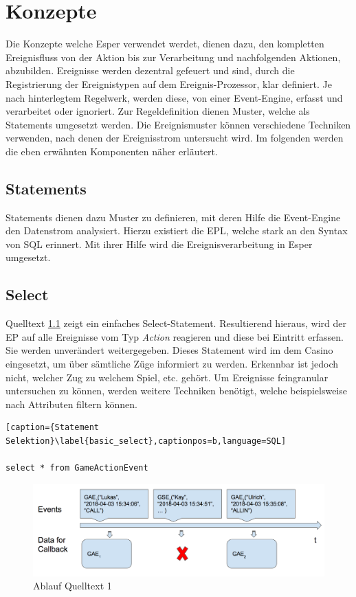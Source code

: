 \chapter{Konzepte}
Die Konzepte welche Esper verwendet werdet, dienen dazu, den kompletten Ereignisfluss von der Aktion bis zur Verarbeitung und nachfolgenden Aktionen, abzubilden.
Ereignisse werden dezentral gefeuert und sind, durch die Registrierung der Ereignistypen auf dem Ereignis-Prozessor, klar definiert. Je nach hinterlegtem Regelwerk, werden diese, von einer Event-Engine, erfasst und verarbeitet oder ignoriert. Zur Regeldefinition dienen Muster, welche als Statements umgesetzt werden. Die Ereignismuster können verschiedene Techniken verwenden, nach denen der Ereignisstrom untersucht wird. Im folgenden werden die eben erwähnten Komponenten näher erläutert.

\section{Statements}

Statements dienen dazu Muster zu definieren, mit deren Hilfe die Event-Engine den Datenstrom analysiert. Hierzu existiert die \acf{EPL}, welche stark an den Syntax von SQL erinnert. Mit ihrer Hilfe wird die Ereignisverarbeitung in Esper umgesetzt.

\section{Select}

Quelltext \ref{basic_select} zeigt ein einfaches Select-Statement. Resultierend hieraus, wird der \acf{EP} auf alle Ereignisse vom Typ \textit{Action} reagieren und diese bei Eintritt erfassen. Sie werden unverändert weitergegeben. Dieses Statement wird im dem Casino eingesetzt, um über sämtliche Züge informiert zu werden. Erkennbar ist jedoch nicht, welcher Zug zu welchem Spiel, etc. gehört. Um Ereignisse feingranular untersuchen zu können, werden weitere Techniken benötigt, welche beispielsweise nach Attributen filtern können.

\begin{lstlisting}[caption={Statement Selektion}\label{basic_select},captionpos=b,language=SQL]

select * from GameActionEvent

\end{lstlisting}

\begin{figure}[h]
	\centering
	\includegraphics[width=\textwidth,height=\textheight, keepaspectratio]{images/statement_basic_select.png}
	\caption{Ablauf Quelltext 1}
	\label{basic_select}
\end{figure}

